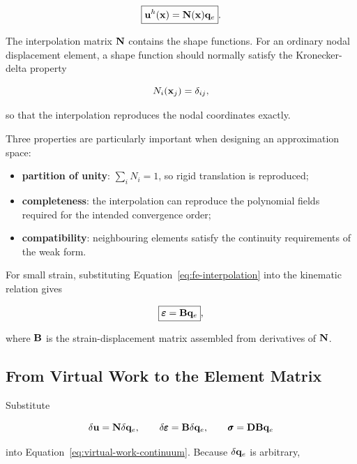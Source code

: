 \begin{equation}\label{eq:fe-interpolation}
    \boxed{
    \mathbf{u}^h(\mathbf{x})=\mathbf{N}(\mathbf{x})\mathbf{q}_e
    }.
\end{equation}

The interpolation matrix $\mathbf{N}$ contains the shape functions. For an ordinary
nodal displacement element, a shape function should normally satisfy the
Kronecker-delta property

\begin{equation}
    N_i(\mathbf{x}_j)=\delta_{ij},
\end{equation}

so that the interpolation reproduces the nodal coordinates exactly.

Three properties are particularly important when designing an approximation
space:

\begin{itemize}
    \item \textbf{partition of unity}: $\sum_iN_i=1$, so rigid translation is
          reproduced;
    \item \textbf{completeness}: the interpolation can reproduce the polynomial
          fields required for the intended convergence order;
    \item \textbf{compatibility}: neighbouring elements satisfy the continuity
          requirements of the weak form.
\end{itemize}

For small strain, substituting Equation~\eqref{eq:fe-interpolation} into the
kinematic relation gives

\begin{equation}\label{eq:Bq}
    \boxed{
    \pmb{\varepsilon}=\mathbf{B}\mathbf{q}_e
    },
\end{equation}

where $\mathbf{B}$ is the strain-displacement matrix assembled from derivatives of
$\mathbf{N}$.

\subsection{From Virtual Work to the Element Matrix}

Substitute

\begin{equation}
    \delta\mathbf{u}=\mathbf{N}\delta\mathbf{q}_e,
    \qquad
    \delta\pmb{\varepsilon}=\mathbf{B}\delta\mathbf{q}_e,
    \qquad
    \pmb{\sigma}=\mathbf{D}\mathbf{B}\mathbf{q}_e
\end{equation}

into Equation~\eqref{eq:virtual-work-continuum}. Because
$\delta\mathbf{q}_e$ is arbitrary,

